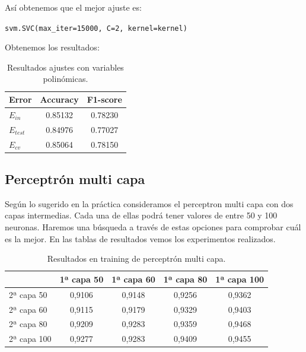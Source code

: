 \documentclass[11pt,a4paper]{article}
\begin{document}
Así obtenemos que el mejor ajuste es:

{\begin{center}
    \texttt{svm.SVC(max\_iter=15000, C=2, kernel=kernel)}
  \end{center}}

Obtenemos los resultados:

\begin{table}[h]
\begin{center}
\begin{tabular}{|l|c|c|}
\hline
  Error & Accuracy & F1-score \\ \hline
  $E_{in}$ & 0.85132 & 0.78230 \\
  $E_{test}$ & 0.84976 & 0.77027  \\
  $E_{cv}$ &0.85064 & 0.78150  \\\hline
\end{tabular}
\caption{Resultados ajustes con variables polinómicas.}

\end{center}
\end{table}

\subsection{Perceptrón multi capa}

Según lo sugerido en la práctica consideramos el perceptron multi capa con dos capas intermedias. Cada una de ellas podrá tener valores de entre 50 y 100 neuronas. Haremos una búsqueda a través de estas opciones para comprobar cuál es la mejor. En las tablas de resultados vemos los experimentos realizados.

\begin{table}[h]
\begin{center}
\begin{tabular}{|l|c|c|c|c|}
\hline

  & 1ª capa 50 & 1ª capa 60 & 1ª capa 80 & 1ª capa 100 \\ \hline
  2ª capa 50 & 0,9106 & 0,9148 & 0,9256 & 0,9362\\
  2ª capa 60 & 0,9115 & 0,9179 & 0,9329 & 0,9403\\
  2ª capa 80 & 0,9209 & 0,9283 & 0,9359 & 0,9468\\
  2ª capa 100 & 0,9277 & 0,9283 & 0,9409 & 0,9455\\\hline
\end{tabular}
\caption{Resultados en training de perceptrón multi capa.}

\end{center}
\end{table}
\end{document}
